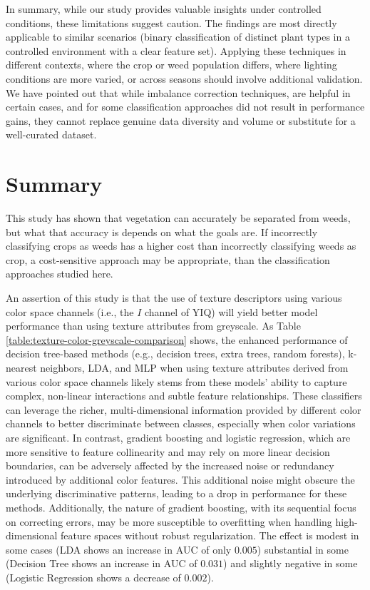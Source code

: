 \documentclass[letterpaper, notitlepage]{report}
\begin{document}
In summary, while our study provides valuable insights under controlled conditions, these limitations suggest caution. The findings are most directly applicable to similar scenarios (binary classification of distinct plant types in a controlled environment with a clear feature set). Applying these techniques in different contexts, where the crop or weed population differs, where lighting conditions are more varied, or across seasons should involve additional validation. We have pointed out that while  imbalance correction techniques, are helpful in certain cases, and for some classification approaches did not result in performance gains, they cannot replace genuine data diversity and volume or substitute for a well-curated dataset.

\section{Summary}
This study has shown that vegetation can accurately be separated from weeds, but what that accuracy is depends on what the goals are. If incorrectly classifying crops as weeds has a higher cost than incorrectly classifying weeds as crop, a cost-sensitive approach may be appropriate, than the classification approaches studied here. 

An assertion of this study is that the use of texture descriptors using various color space channels (i.e., the $I$ channel of YIQ) will yield better model performance than using texture attributes from greyscale.  As Table \ref{table:texture-color-greyscale-comparison} shows, the enhanced performance of decision tree-based methods (e.g., decision trees, extra trees, random forests), k-nearest neighbors, LDA, and MLP when using texture attributes derived from various color space channels likely stems from these models’ ability to capture complex, non-linear interactions and subtle feature relationships. These classifiers can leverage the richer, multi-dimensional information provided by different color channels to better discriminate between classes, especially when color variations are significant. In contrast, gradient boosting and logistic regression, which are more sensitive to feature collinearity and may rely on more linear decision boundaries, can be adversely affected by the increased noise or redundancy introduced by additional color features. This additional noise might obscure the underlying discriminative patterns, leading to a drop in performance for these methods. Additionally, the nature of gradient boosting, with its sequential focus on correcting errors, may be more susceptible to overfitting when handling high-dimensional feature spaces without robust regularization. The effect is modest in some cases (LDA shows an increase in AUC of only $0.005$) substantial in some (Decision Tree shows an increase in AUC of $0.031$) and slightly negative in some (Logistic Regression shows a decrease of $0.002$).
\end{document}
